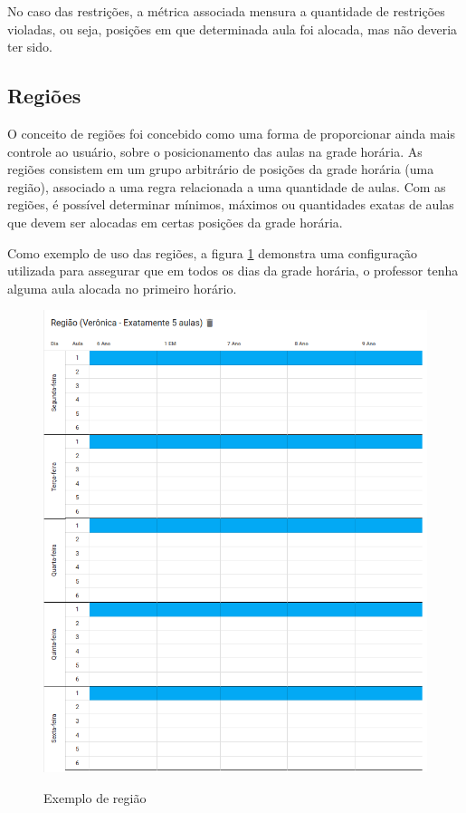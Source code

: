 No caso das restrições, a métrica associada mensura a quantidade de restrições violadas, ou seja, posições em que determinada aula foi alocada, mas não deveria ter sido.

\subsection{Regiões}

O conceito de regiões foi concebido como uma forma de proporcionar ainda mais controle ao usuário, sobre o posicionamento das aulas na grade horária. As regiões consistem em um grupo arbitrário de posições da grade horária (uma região), associado a uma regra relacionada a uma quantidade de aulas. Com as regiões, é possível determinar mínimos, máximos ou quantidades exatas de aulas que devem ser alocadas em certas posições da grade horária.

Como exemplo de uso das regiões, a figura \ref{fig:regioes} demonstra uma configuração utilizada para assegurar que em todos os dias da grade horária, o professor tenha alguma aula alocada no primeiro horário.

\begin{figure}[!htb]
	\centering
	\caption{Exemplo de região}
	\includegraphics[width=1\textwidth]{./dados/figuras/regioes}
	\label{fig:regioes}
\end{figure}
\pagebreak

